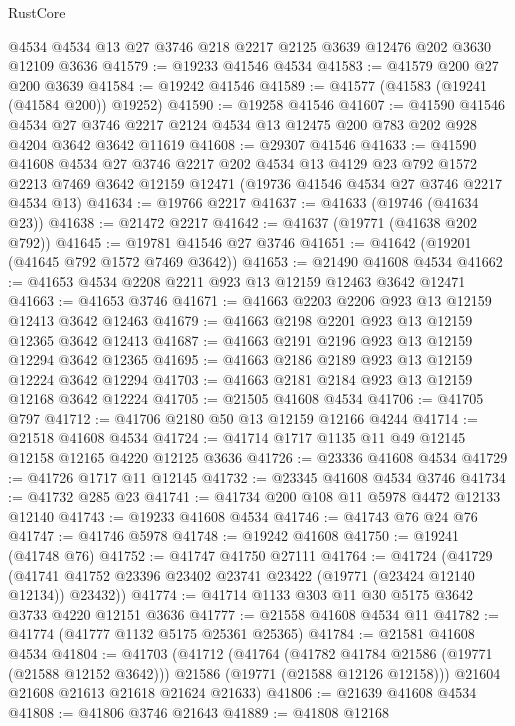 \begin{lexlean}{RustCore}
\begin{coremodule}
    @4534
    @4534
    @13
    @27
    @3746
    @218
    @2217
    @2125
    @3639
    @12476
    @202
    @3630
    @12109
    @3636
@41579 := @19233 @41546 @4534
@41583 := @41579 @200 @27 @200 @3639
@41584 := @19242 @41546
@41589 := @41577 (@41583 (@19241 (@41584 @200)) @19252)
@41590 := @19258 @41546
@41607 := @41590
    @41546
    @4534
    @27
    @3746
    @2217
    @2124
    @4534
    @13
    @12475
    @200
    @783
    @202
    @928
    @4204
    @3642
    @3642
    @11619
@41608 := @29307 @41546
@41633 := @41590
    @41608
    @4534
    @27
    @3746
    @2217
    @202
    @4534
    @13
    @4129
    @23
    @792
    @1572
    @2213
    @7469
    @3642
    @12159
    @12471
    (@19736 @41546 @4534 @27 @3746 @2217 @4534 @13)
@41634 := @19766 @2217
@41637 := @41633 (@19746 (@41634 @23))
@41638 := @21472 @2217
@41642 := @41637 (@19771 (@41638 @202 @792))
@41645 := @19781 @41546 @27 @3746
@41651 := @41642 (@19201 (@41645 @792 @1572 @7469 @3642))
@41653 := @21490 @41608 @4534
@41662 := @41653 @4534 @2208 @2211 @923 @13 @12159 @12463 @3642 @12471
@41663 := @41653 @3746
@41671 := @41663 @2203 @2206 @923 @13 @12159 @12413 @3642 @12463
@41679 := @41663 @2198 @2201 @923 @13 @12159 @12365 @3642 @12413
@41687 := @41663 @2191 @2196 @923 @13 @12159 @12294 @3642 @12365
@41695 := @41663 @2186 @2189 @923 @13 @12159 @12224 @3642 @12294
@41703 := @41663 @2181 @2184 @923 @13 @12159 @12168 @3642 @12224
@41705 := @21505 @41608 @4534
@41706 := @41705 @797
@41712 := @41706 @2180 @50 @13 @12159 @12166 @4244
@41714 := @21518 @41608 @4534
@41724 := @41714 @1717 @1135 @11 @49 @12145 @12158 @12165 @4220 @12125 @3636
@41726 := @23336 @41608 @4534
@41729 := @41726 @1717 @11 @12145
@41732 := @23345 @41608 @4534 @3746
@41734 := @41732 @285 @23
@41741 := @41734 @200 @108 @11 @5978 @4472 @12133 @12140
@41743 := @19233 @41608 @4534
@41746 := @41743 @76 @24 @76
@41747 := @41746 @5978
@41748 := @19242 @41608
@41750 := @19241 (@41748 @76)
@41752 := @41747 @41750 @27111
@41764 := @41724
    (@41729 (@41741 @41752 @23396 @23402 @23741 @23422 (@19771 (@23424 @12140 @12134)) @23432))
@41774 := @41714 @1133 @303 @11 @30 @5175 @3642 @3733 @4220 @12151 @3636
@41777 := @21558 @41608 @4534 @11
@41782 := @41774 (@41777 @1132 @5175 @25361 @25365)
@41784 := @21581 @41608 @4534
@41804 := @41703
    (@41712
      (@41764
        (@41782 @41784 @21586 (@19771 (@21588 @12152 @3642)))
        @21586
        (@19771 (@21588 @12126 @12158)))
      @21604
      @21608
      @21613
      @21618
      @21624
      @21633)
@41806 := @21639 @41608 @4534
@41808 := @41806 @3746 @21643
@41889 := @41808
    @12168

\end{coremodule}
\end{lexlean}
